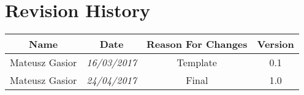 \chapter*{Revision History}

\begin{center}
	\begin{tabular}{|c|c|c|c|}
		\hline
		Name & Date & Reason For Changes & Version\\
		\hline
		Mateusz Gasior & \emph{16/03/2017} & Template & 0.1 \\ \hline
		Mateusz Gasior & \emph{24/04/2017} & Final & 1.0 \\ \hline
		\hline
	\end{tabular}
\end{center}